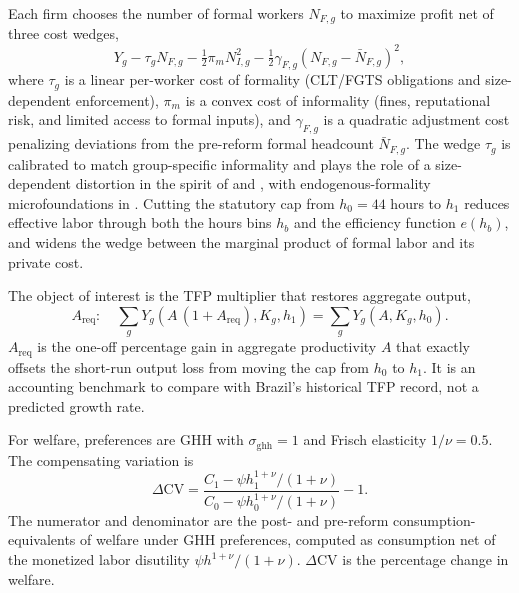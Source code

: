 Each firm chooses the number of formal workers $N_{F,g}$ to maximize profit net of three cost wedges,
\begin{equation}\label{eq:firm}
    Y_g-\tau_g N_{F,g}-\tfrac{1}{2}\pi_m N_{I,g}^2-\tfrac{1}{2}\gamma_{F,g}(N_{F,g}-\bar{N}_{F,g})^2,
\end{equation}
where $\tau_g$ is a linear per-worker cost of formality (CLT/FGTS obligations and size-dependent enforcement), $\pi_m$ is a convex cost of informality (fines, reputational risk, and limited access to formal inputs), and $\gamma_{F,g}$ is a quadratic adjustment cost penalizing deviations from the pre-reform formal headcount $\bar{N}_{F,g}$. The wedge $\tau_g$ is calibrated to match group-specific informality and plays the role of a size-dependent distortion in the spirit of \citet{HsiehKlenow2009} and \citet{RestucciaRogerson2008}, with endogenous-formality microfoundations in \citet{DixCarneiroGoldbergMeghirUlyssea2026}. Cutting the statutory cap from $h_0=44$ hours to $h_1$ reduces effective labor through both the hours bins $h_b$ and the efficiency function $e(h_b)$, and widens the wedge between the marginal product of formal labor and its private cost.

The object of interest is the TFP multiplier that restores aggregate output,
\begin{equation}\label{eq:areq}
    A_{\text{req}}:\quad \sum_g Y_g\!\left(A\,(1+A_{\text{req}}),K_g,h_1\right)=\sum_g Y_g(A,K_g,h_0).
\end{equation}
$A_{\text{req}}$ is the one-off percentage gain in aggregate productivity $A$ that exactly offsets the short-run output loss from moving the cap from $h_0$ to $h_1$. It is an accounting benchmark to compare with Brazil's historical TFP record, not a predicted growth rate.

For welfare, preferences are GHH \citep{GreenwoodHercowitzHuffman1988} with $\sigma_{\text{ghh}}=1$ and Frisch elasticity $1/\nu=0.5$. The compensating variation is
\begin{equation}\label{eq:cv}
    \Delta\text{CV}=\frac{C_1-\psi h_1^{1+\nu}/(1+\nu)}{C_0-\psi h_0^{1+\nu}/(1+\nu)}-1.
\end{equation}
The numerator and denominator are the post- and pre-reform consumption-equivalents of welfare under GHH preferences, computed as consumption net of the monetized labor disutility $\psi h^{1+\nu}/(1+\nu)$. $\Delta$CV is the percentage change in welfare.

